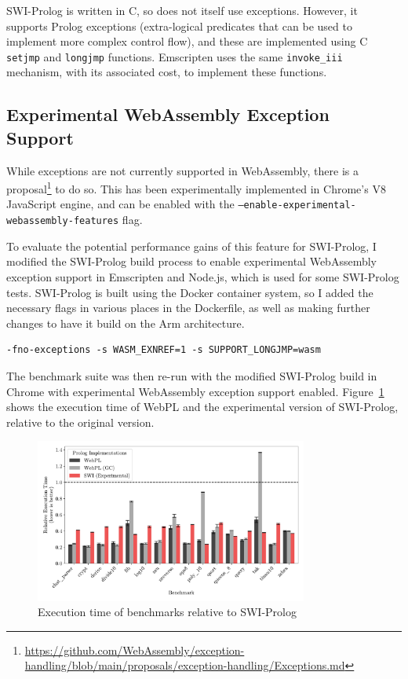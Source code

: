 SWI-Prolog is written in C, so does not itself use exceptions. However, it supports Prolog exceptions (extra-logical predicates that can be used to implement more complex control flow), and these are implemented using C \texttt{setjmp} and \texttt{longjmp} functions. Emscripten uses the same \texttt{invoke\_iii} mechanism, with its associated cost, to implement these functions.

\subsection{Experimental WebAssembly Exception Support}

While exceptions are not currently supported in WebAssembly, there is a proposal\footnote{\url{https://github.com/WebAssembly/exception-handling/blob/main/proposals/exception-handling/Exceptions.md}} to do so. This has been experimentally implemented in Chrome's V8 JavaScript engine, and can be enabled with the \texttt{--enable-experimental-webassembly-features} flag.

To evaluate the potential performance gains of this feature for SWI-Prolog, I modified the SWI-Prolog build process to enable experimental WebAssembly exception support in Emscripten and Node.js, which is used for some SWI-Prolog tests. SWI-Prolog is built using the Docker container system, so I added the necessary flags in various places in the Dockerfile, as well as making further changes to have it build on the Arm architecture.

\vspace*{-1em}

\begin{verbatim}
-fno-exceptions -s WASM_EXNREF=1 -s SUPPORT_LONGJMP=wasm
\end{verbatim}

\vspace*{-1em}

The benchmark suite was then re-run with the modified SWI-Prolog build in Chrome with experimental WebAssembly exception support enabled. Figure~\ref{fig:swi-prolog-exception} shows the execution time of WebPL and the experimental version of SWI-Prolog, relative to the original version.

\begin{figure}[H]
\centering
\includegraphics[width=0.8\textwidth]{relative_performance_exnref.pdf}
\caption{Execution time of benchmarks relative to SWI-Prolog}
\label{fig:swi-prolog-exception}
\end{figure}

